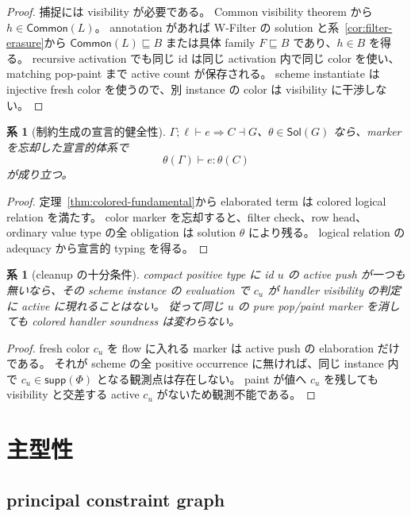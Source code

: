 \documentclass[uplatex,dvipdfmx,a4paper,10.5pt]{jsarticle}
\theoremstyle{jpplain}
\newtheorem{corollary}[definition]{系}
\newcommand{\Common}{\mathsf{Common}}
\newcommand{\sol}{\mathsf{Sol}}
\newcommand{\supp}{\mathsf{supp}}
\begin{document}
\begin{proof}
捕捉には visibility が必要である。
Common visibility theorem から $h\in\Common(L)$。
annotation があれば W-Filter の solution と系~\ref{cor:filter-erasure}から $\Common(L)\sqsubseteq B$ または具体 family $F\sqsubseteq B$ であり、$h\in B$ を得る。
recursive activation でも同じ id は同じ activation 内で同じ color を使い、matching pop-paint まで active count が保存される。
scheme instantiate は injective fresh color を使うので、別 instance の color は visibility に干渉しない。
\end{proof}

\begin{corollary}[制約生成の宣言的健全性]\label{cor:declarative-soundness}
$\Gamma;\ell\vdash e\Rightarrow C\dashv G$、$\theta\in\sol(G)$ なら、marker を忘却した宣言的体系で
\[
  \theta(\Gamma)\vdash e:\theta(C)
\]
が成り立つ。
\end{corollary}

\begin{proof}
定理~\ref{thm:colored-fundamental}から elaborated term は colored logical relation を満たす。
color marker を忘却すると、filter check、row head、ordinary value type の全 obligation は solution $\theta$ により残る。
logical relation の adequacy から宣言的 typing を得る。
\end{proof}

\begin{corollary}[cleanup の十分条件]
compact positive type に id $u$ の active push が一つも無いなら、その scheme instance の evaluation で
$c_u$ が handler visibility の判定に active に現れることはない。
従って同じ $u$ の pure pop/paint marker を消しても colored handler soundness は変わらない。
\end{corollary}

\begin{proof}
fresh color $c_u$ を flow に入れる marker は active push の elaboration だけである。
それが scheme の全 positive occurrence に無ければ、同じ instance 内で $c_u\in\supp(\Phi)$ となる観測点は存在しない。
paint が値へ $c_u$ を残しても visibility と交差する active $c_u$ がないため観測不能である。
\end{proof}


\section{主型性}

\subsection{principal constraint graph}
\end{document}
